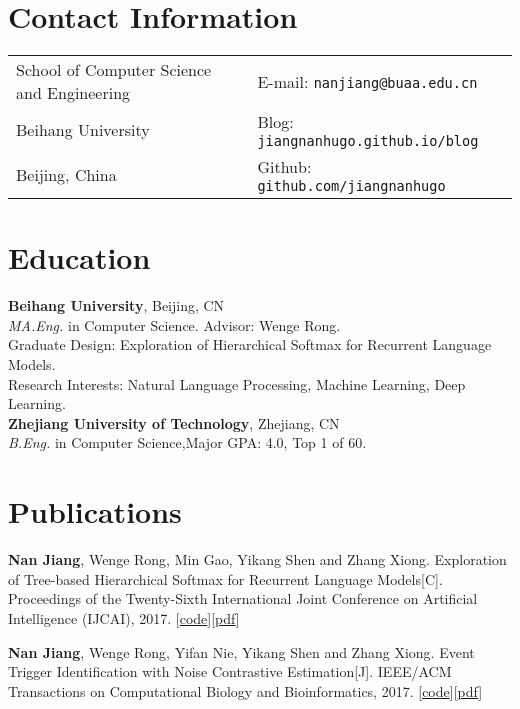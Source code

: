 \documentclass[margin,line]{resume}
\begin{document}

\begin{resume}
\section{Contact Information}
\begin{tabular}{@{}p{3in}p{3in}}
School of Computer Science and Engineering & { E-mail:}  {\tt nanjiang@buaa.edu.cn} \\
Beihang University                         & { Blog:} {\tt jiangnanhugo.github.io/blog} \\
Beijing, China                             & { Github:} {\tt github.com/jiangnanhugo} \\
\end{tabular}


\section{Education}
{\bf Beihang University}, Beijing,  CN\\
\emph{MA.Eng.} in Computer Science. Advisor: Wenge Rong.\\
Graduate Design: Exploration of Hierarchical Softmax for Recurrent Language Models. \\
Research Interests: Natural Language Processing, Machine Learning, Deep Learning. \\

{\bf Zhejiang University of Technology}, Zhejiang, CN\\
\emph{B.Eng.} in Computer Science,\space Major GPA: 4.0, Top 1 of 60.


\section{Publications}
\textbf{Nan Jiang}, Wenge Rong, Min Gao, Yikang Shen and Zhang Xiong. Exploration of Tree-based Hierarchical Softmax for Recurrent Language Models[C]. Proceedings of the Twenty-Sixth International Joint Conference on Artificial Intelligence (IJCAI), 2017. [\href{https://github.com/jiangnanHugo/lmkit}{code}][\href{https://www.ijcai.org/proceedings/2017/0271.pdf}{pdf}]


\textbf{Nan Jiang}, Wenge Rong, Yifan Nie, Yikang Shen and Zhang Xiong. Event Trigger Identification with Noise Contrastive Estimation[J]. IEEE/ACM Transactions on Computational Biology and Bioinformatics, 2017. [\href{https://github.com/jiangnanHugo/mlee-nce}{code}][\href{https://github.com/jiangnanhugo/paper/blob/master/APBC2017/APBC2017.pdf}{pdf}]


\end{resume}
\end{document}
